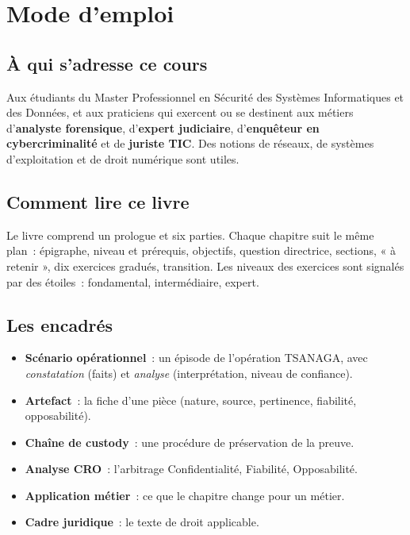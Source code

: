 
\chapter*{Mode d'emploi}

\section*{À qui s'adresse ce cours}

Aux étudiants du Master Professionnel en Sécurité des Systèmes Informatiques
et des Données, et aux praticiens qui exercent ou se destinent aux métiers
d'\textbf{analyste forensique}, d'\textbf{expert judiciaire},
d'\textbf{enquêteur en cybercriminalité} et de \textbf{juriste TIC}. Des
notions de réseaux, de systèmes d'exploitation et de droit numérique sont
utiles.

\section*{Comment lire ce livre}

Le livre comprend un prologue et six parties. Chaque chapitre suit le même
plan~: épigraphe, niveau et prérequis, objectifs, question directrice, sections,
« à retenir », dix exercices gradués, transition. Les niveaux des exercices
sont signalés par des étoiles~: \niveaubase{} fondamental, \niveaumoyen{}
intermédiaire, \niveauexpert{} expert.

\section*{Les encadrés}

\begin{itemize}
    \item \textbf{Scénario opérationnel}~: un épisode de l'opération TSANAGA,
          avec \emph{constatation} (faits) et \emph{analyse} (interprétation,
          niveau de confiance).
    \item \textbf{Artefact}~: la fiche d'une pièce (nature, source, pertinence,
          fiabilité, opposabilité).
    \item \textbf{Chaîne de custody}~: une procédure de préservation de la
          preuve.
    \item \textbf{Analyse CRO}~: l'arbitrage Confidentialité, Fiabilité,
          Opposabilité.
    \item \textbf{Application métier}~: ce que le chapitre change pour un
          métier.
    \item \textbf{Cadre juridique}~: le texte de droit applicable.
\end{itemize}

